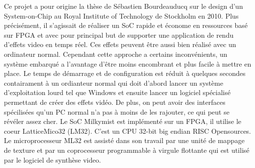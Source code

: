 \vspace{15px}

Ce projet a pour origine la thèse de Sébastien Bourdeauducq sur le design d'un System-on-Chip au Royal Institute of Technology de Stockholm en 2010. Plus précisément, il s'agissait de réaliser un SoC rapide et économe en ressources basé sur FPGA et avec pour principal but de supporter une application de rendu d'effets video en temps réel. Ces effets peuvent être aussi bien réalisé avec un ordinateur normal. Cependant cette approche a certains inconvénients, un système embarqué a l'avantage d'être moins encombrant et plus facile à mettre en place. Le temps de démarrage et de configuration est réduit à  quelques secondes contairament à un ordianteur normal qui doit d'abord lancer un système d'exploitation lourd tel que Windows et ensuite lancer un logiciel spécialisé permettant de créer des effets vidéo. De plus, on peut avoir des interfaces spécilisées qu'un PC normal n'a pas à moins de les rajouter, ce qui peut se révéler assez cher.
Le SoC Milkymist est implémenté sur un FPGA, il utilise le coeur LatticeMico32 (LM32). C'est un CPU 32-bit big endian RISC Opensources. Le microprocesseur ML32 est assisté dans son travail par une unité de mappage de texture et par un coprocesseur programmable à virgule flottante qui est utilisé par le logiciel de synthèse video.
\medskip